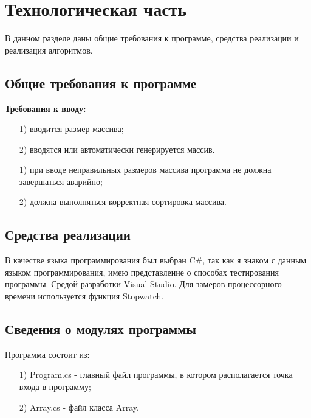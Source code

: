 \documentclass[12pt]{report}
\begin{document}
	\chapter{Технологическая часть}
	В данном разделе даны общие требования к программе, средства реализации и реализация алгоритмов.

	\section{Общие требования к программе}
	\textbf{Требования к вводу:}
	\begin{enumerate}
		\item[1)] вводится размер массива;
		\item[2)] вводятся или автоматически генерируется массив. 
	\end{enumerate}
	\begin{enumerate}
		\item[1)] при вводе неправильных размеров массива программа не должна завершаться аварийно;
		\item[2)] должна выполняться корректная сортировка массива. 
	\end{enumerate}

	\section{Средства реализации}
	В качестве языка программирования был выбран C#, так как я знаком с данным языком программирования, имею представление о способах тестирования программы.
	\noindent Средой разработки Visual Studio.
	\noindent Для замеров процессорного времени используется функция Stopwatch.

	\section{Сведения о модулях программы}
	Программа состоит из:
	\begin{enumerate}
		\item[1)] Program.cs - главный файл программы, в котором располагается точка входа в программу;
		\item[2)] Array.cs - файл класса Array. 
	\end{enumerate}
\end{document}
